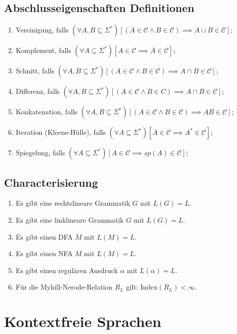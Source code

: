\documentclass[9pt]{article}
\begin{document}
\subsection{Abschlusseigenschaften Definitionen}
\begin{enumerate}
	\item Vereinigung, falls $(\forall A, B \subseteq \Sigma^*)[(A \in \mathcal{C} \wedge B \in \mathcal{ C}) \implies A \cup B \in \mathcal{C}]$;
	\item Komplement, falls $(\forall A \subseteq \Sigma^*)[A \in \mathcal{C} \implies \overline{A}\in\mathcal{C}]$;
	\item Schnitt, falls $(\forall A, B \subseteq \Sigma^*)[(A \in \mathcal{C} \wedge B \in \mathcal{C}) \implies A \cap B \in \mathcal{C}]$;
	\item Differenz, falls $(\forall A, B \subseteq \Sigma^*)[(A \in \mathcal{C} \wedge B \in C) \implies A \cap B \in \mathcal{C}]$;
	\item Konkatenation, falls $(\forall A, B \subseteq \Sigma^*)[(A \in \mathcal{C} \wedge B \in \mathcal{C})\implies AB \in \mathcal{C}]$;
	\item Iteration (Kleene-Hülle), falls $(\forall A \subseteq \Sigma^*)[A\in\mathcal{C}\implies A^*\in\mathcal{C}]$;
	\item Spiegelung, falls $(\forall A\subseteq \Sigma^*)[A\in\mathcal{C}\implies sp(A)\in\mathcal{C}]$;
\end{enumerate}
\subsection{Characterisierung}
\begin{enumerate}
	\item Es gibt eine rechtslineare Grammatik $G$ mit $L(G) = L$.
	\item Es gibt eine linklineare Grammatik $G$ mit $L(G)=L$.
	\item Es gibt einen DFA $M$ mit $L(M)=L$.
	\item Es gibt einen NFA $M$ mit $L(M)=L$.
	\item Es gibt einen regulären Ausdruck $\alpha$ mit $L(\alpha)=L$.
	\item Für die Myhill-Nerode-Relation $R_L$ gilt: $\text{Index}(R_L)<\infty$.
\end{enumerate}
\section{Kontextfreie Sprachen}
\end{document}
